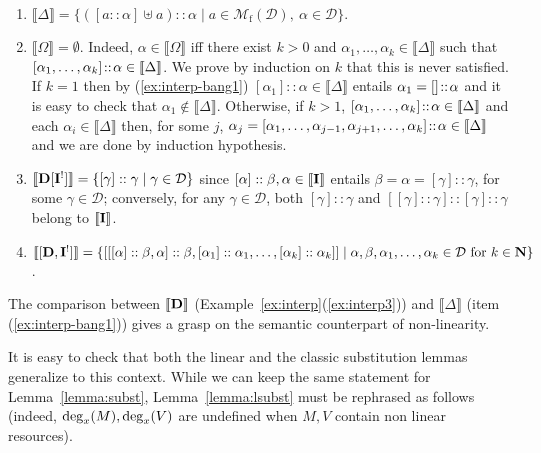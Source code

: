 \documentclass{LMCS}
\newcommand{\nat}{\mathbf{N}}
\newcommand{\st}{ \mid }
\newcommand{\Int}[1]{\llbracket #1\rrbracket} \newcommand{\trm}[1]{#1^{\textrm{--}}}
\newcommand{\Mfin}[1]{\mathcal{M}_{\mathrm{f}}(#1)}
\newcommand{\mcup}{\uplus}
\newcommand{\cD}{\mathcal{D}}
\begin{document}
\begin{exa}\label{ex:interp-bang}\
\begin{enumerate}[1.]
\item\label{ex:interp-bang1} 
	$\Int{\Delta}=\{ ([a::\alpha]\mcup a)::\alpha\st a\in\Mfin\cD ,\ \alpha \in {\cD} \}$.
\item\label{ex:interp-bang2} 
	$\Int{\Omega} = \emptyset$. Indeed, $\alpha\in\Int{\Omega}$ iff there exist $k > 0$ and $ \alpha_1,\dots,\alpha_k\in\Int{\Delta}$ such that $[\alpha_1,\dots,\alpha_k] \at \alpha\in\Int{\Delta}$.
	We prove by induction on $k$ that this is never satisfied.
	If $k = 1$ then by (\ref{ex:interp-bang1}) $[\alpha_1] :: \alpha\in\Int{\Delta}$ entails $\alpha_1 = []\!::\! \alpha$ and it is easy to check that $\alpha_1\notin\Int{\Delta}$. 
	Otherwise, if $k>1$, $[\alpha_1,\dots,\alpha_k]\at \alpha\in\Int{\Delta}$ and each $\alpha_i\in\Int{\Delta}$ then, for some $j$, 
	$\alpha_j = [\alpha_1,\dots,\alpha_{j-1},\alpha_{j+1},\dots,\alpha_{k}]\at \alpha\in\Int{\Delta}$ and we are done by induction hypothesis.
\item\label{ex:interp-bang3} $\Int{\bold{D}[\bold{I}^!]}=
\{ [\gamma]::\gamma\st\gamma\in {\cD} \} $ since $ [\alpha]::\beta,\alpha\in\Int{\bold{I}}$ entails $\beta=\alpha=[\gamma]::\gamma$, for some $\gamma\in\cD$;
conversely, for any  $\gamma\in\cD$, both  $[\gamma]::\gamma$ and $[[\gamma]::\gamma]::[\gamma]::\gamma$ belong to $\Int{\bold{I}}$.
\item\label{ex:interp-bang4} $\Int{[\bold{D},\bold{I}^!]}= \{[[[\alpha]::\beta,\alpha]::\beta,
[\alpha_1]::\alpha_1,\ldots, [\alpha_k]::\alpha_k]]\st \alpha,\beta,\alpha_1,\ldots,\alpha_k\in \cD\textrm{ for }k\in\nat\}$.
\end{enumerate}
\end{exa}
The comparison between $\Int{\bold{D}}$ (Example~\ref{ex:interp}(\ref{ex:interp3})) and $\Int{\Delta}$ (item (\ref{ex:interp-bang1})) gives a grasp on the semantic counterpart of non-linearity.

It is easy to check that both the linear and the classic substitution lemmas generalize to this context.
While we can keep the same statement for Lemma~\ref{lemma:subst}, Lemma~\ref{lemma:lsubst} must be rephrased as follows
(indeed, $\mathrm{deg}_{x}(M), \mathrm{deg}_{x}(V)$ are undefined when $M,V$ contain non linear resources).
\end{document}
